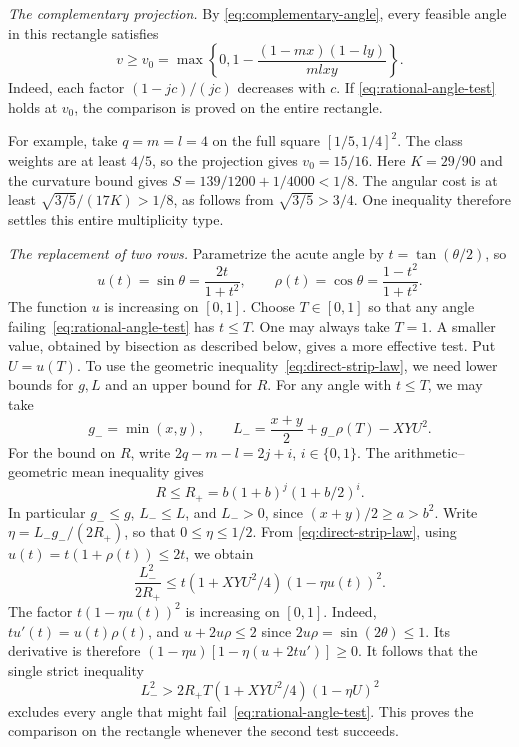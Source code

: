 \documentclass[11pt,a4paper]{article}
\theoremstyle{remark}\newtheorem{remark}[theorem]{Remark}
\numberwithin{equation}{section}
\begin{document}
\smallskip
\noindent\textit{The complementary projection.}
By \eqref{eq:complementary-angle}, every feasible angle in this rectangle
satisfies
\[
 v\ge v_0=\max\left\{0,1-\frac{(1-mx)(1-ly)}{mlxy}\right\}.
\]
Indeed, each factor \((1-jc)/(jc)\) decreases with \(c\). If
\eqref{eq:rational-angle-test} holds at \(v_0\), the comparison
is proved on the entire rectangle.

\smallskip
\noindent For example, take \(q=m=l=4\) on the full square
\([1/5,1/4]^2\). The class weights are at least \(4/5\), so the
projection gives \(v_0=15/16\). Here \(K=29/90\) and the curvature
bound gives \(S=139/1200+1/4000<1/8\). The angular cost is at least
\(\sqrt{3/5}/(17K)>1/8\), as follows from \(\sqrt{3/5}>3/4\).
One inequality therefore settles this entire multiplicity type.

\smallskip
\noindent\textit{The replacement of two rows.}
Parametrize the acute angle by \(t=\tan(\theta/2)\), so
\[
 u(t)=\sin\theta=\frac{2t}{1+t^2},\qquad
 \rho(t)=\cos\theta=\frac{1-t^2}{1+t^2}.
\]
The function \(u\) is increasing on \([0,1]\). Choose \(T\in[0,1]\)
so that any angle failing~\eqref{eq:rational-angle-test} has \(t\le T\).
One may always take \(T=1\). A smaller value, obtained by bisection as
described below, gives a more effective test. Put \(U=u(T)\). To use
the geometric inequality~\eqref{eq:direct-strip-law}, we need lower
bounds for \(g,L\) and an upper bound for \(R\). For any angle with
\(t\le T\), we may take
\[
 g_-=\min(x,y),\qquad
 L_-=\frac{x+y}{2}+g_-\rho(T)-XYU^2 .
\]
For the bound on \(R\), write \(2q-m-l=2j+i\), \(i\in\{0,1\}\).
The arithmetic--geometric mean inequality gives
\[
 R\le R_+=b(1+b)^j(1+b/2)^i .
\]
In particular \(g_-\le g\), \(L_-\le L\), and
\(L_->0\), since \((x+y)/2\ge a>b^2\). Write
\(\eta=L_-g_-/(2R_+)\), so that \(0\le\eta\le1/2\). From
\eqref{eq:direct-strip-law}, using \(u(t)=t(1+\rho(t))\le2t\), we obtain
\[
 \frac{L_-^2}{2R_+}
 \le t(1+XYU^2/4)(1-\eta u(t))^2 .
\]
The factor \(t(1-\eta u(t))^2\) is increasing on \([0,1]\).
Indeed, \(tu'(t)=u(t)\rho(t)\), and
\(u+2u\rho\le2\) since \(2u\rho=\sin(2\theta)\le1\).
Its derivative is therefore
\((1-\eta u)[1-\eta(u+2tu')]\ge0\).
It follows that the single strict inequality
\begin{equation}\label{eq:rational-strip-test}
 L_-^2>2R_+T(1+XYU^2/4)(1-\eta U)^2
\end{equation}
excludes every angle that might fail~\eqref{eq:rational-angle-test}.
This proves the comparison on the rectangle whenever the second test
succeeds.
\end{document}
